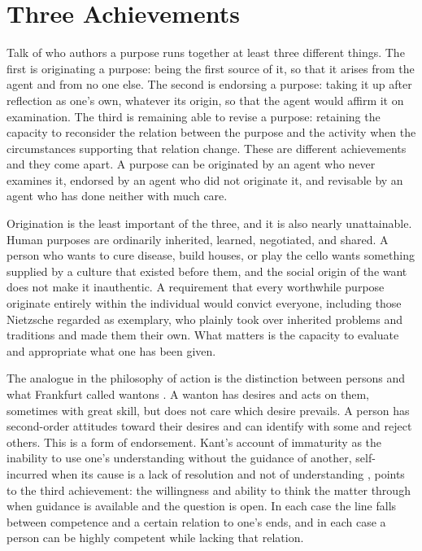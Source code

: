 \documentclass[11pt]{article}
\begin{document}
\section{Three Achievements}

Talk of who authors a purpose runs together at least three different things. The first is originating a purpose: being the first source of it, so that it arises from the agent and from no one else. The second is endorsing a purpose: taking it up after reflection as one's own, whatever its origin, so that the agent would affirm it on examination. The third is remaining able to revise a purpose: retaining the capacity to reconsider the relation between the purpose and the activity when the circumstances supporting that relation change. These are different achievements and they come apart. A purpose can be originated by an agent who never examines it, endorsed by an agent who did not originate it, and revisable by an agent who has done neither with much care.

Origination is the least important of the three, and it is also nearly unattainable. Human purposes are ordinarily inherited, learned, negotiated, and shared. A person who wants to cure disease, build houses, or play the cello wants something supplied by a culture that existed before them, and the social origin of the want does not make it inauthentic. A requirement that every worthwhile purpose originate entirely within the individual would convict everyone, including those Nietzsche regarded as exemplary, who plainly took over inherited problems and traditions and made them their own. What matters is the capacity to evaluate and appropriate what one has been given.

The analogue in the philosophy of action is the distinction between persons and what Frankfurt called wantons \cite{frankfurt1971}. A wanton has desires and acts on them, sometimes with great skill, but does not care which desire prevails. A person has second-order attitudes toward their desires and can identify with some and reject others. This is a form of endorsement. Kant's account of immaturity as the inability to use one's understanding without the guidance of another, self-incurred when its cause is a lack of resolution and not of understanding \cite{kant1784}, points to the third achievement: the willingness and ability to think the matter through when guidance is available and the question is open. In each case the line falls between competence and a certain relation to one's ends, and in each case a person can be highly competent while lacking that relation.
\end{document}
